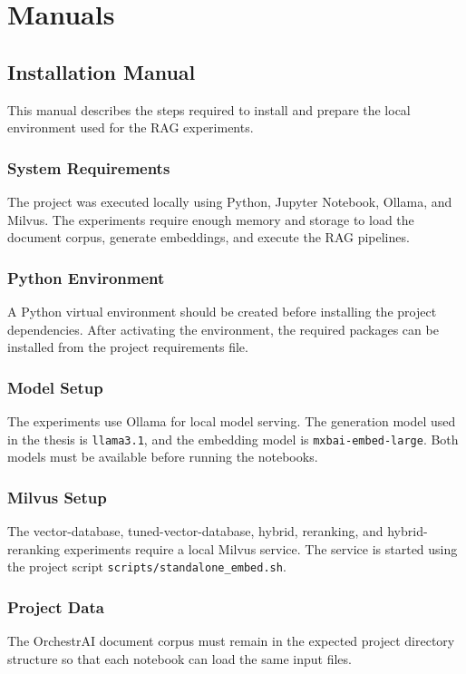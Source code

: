 \chapter*{Manuals}

\section*{Installation Manual}

This manual describes the steps required to install and prepare the local environment used for the RAG experiments.

\subsection*{System Requirements}
The project was executed locally using Python, Jupyter Notebook, Ollama, and Milvus. The experiments require enough memory and storage to load the document corpus, generate embeddings, and execute the RAG pipelines.

\subsection*{Python Environment}
A Python virtual environment should be created before installing the project dependencies. After activating the environment, the required packages can be installed from the project requirements file.

\subsection*{Model Setup}
The experiments use Ollama for local model serving. The generation model used in the thesis is \texttt{llama3.1}, and the embedding model is \texttt{mxbai-embed-large}. Both models must be available before running the notebooks.

\subsection*{Milvus Setup}
The vector-database, tuned-vector-database, hybrid, reranking, and hybrid-reranking experiments require a local Milvus service. The service is started using the project script \texttt{scripts/standalone\_embed.sh}.

\subsection*{Project Data}
The OrchestrAI document corpus must remain in the expected project directory structure so that each notebook can load the same input files.

